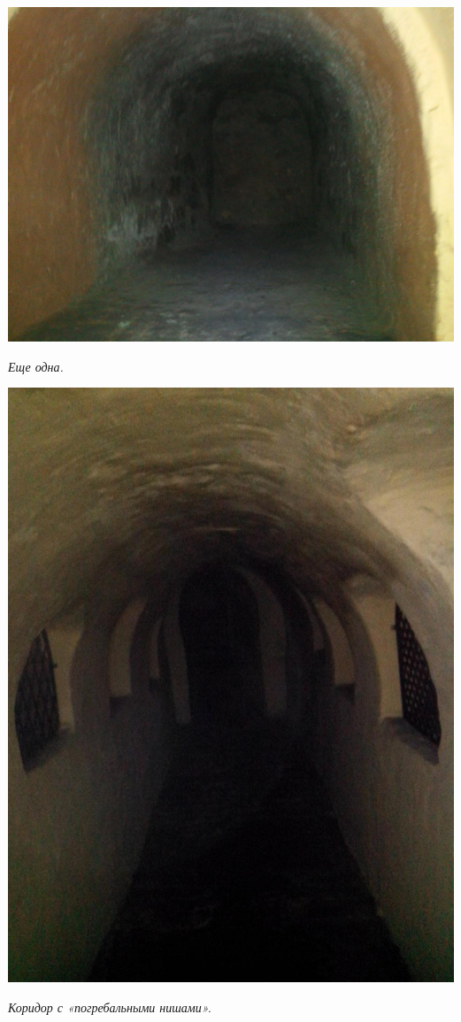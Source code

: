 \begin{center}
\includegraphics[width=0.96\linewidth]{chast-colebanie-osnov/nachalo/IMG_20170626_135152.jpg}

\textit{Еще одна.}
\end{center}

\newpage
\vspace*{\fill}
\begin{center}
\includegraphics[width=\linewidth]{chast-colebanie-osnov/nachalo/IMG_20170626_135248.jpg}

\textit{Коридор с «погребальными нишами».}
\end{center}
\vspace*{\fill}

